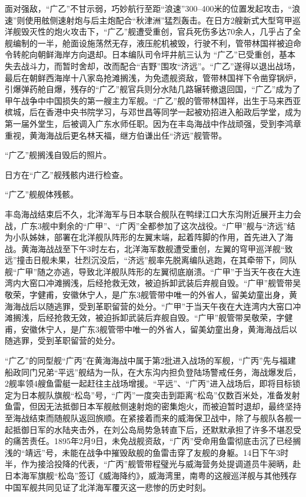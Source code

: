 \documentclass[12pt,UTF8]{ctexbook}
\begin{document}
面对强敌，“广乙”不甘示弱，巧妙航行至距“浪速”300--400米的位置发起攻击，“浪速”则使用舷侧速射炮与后主炮配合“秋津洲”猛烈轰击。在日方2艘新式大型穹甲巡洋舰毁灭性的炮火攻击下，“广乙”舰遭受重创，官兵死伤多达70余人，几乎占了全舰编制的一半，舱面设施荡然无存，液压舵机被毁，行驶不利，管带林国祥被迫命令转舵向朝鲜海岸方向退却。日本编队司令坪井航三认为 “广乙”已受重创，基本失去战斗力，而暂时舍却，改而配合“吉野”围攻“济远”。“广乙”遂得以退出战场，最后在朝鲜西海岸十八家岛抢滩搁浅，为免遗舰资敌，管带林国祥下令凿穿锅炉，引爆弹药舱自爆，残存的“广乙”舰官兵则分水陆几路辗转撤退回国，“广乙”成为了甲午战争中中国损失的第一艘主力军舰。“广乙”舰的管带林国祥，出生于马来西亚槟城，后在香港中央书院学习，与邓世昌等同学一起被劝招进入船政后学堂，成为第一届外堂生，后被调入广东水师任职。因为在丰岛海战中作战顽强，受到李鸿章重视，黄海海战后更名林天福，继方伯谦出任“济远”舰管带。

“广乙”舰搁浅自毁后的照片。

日方在“广乙”舰残骸内进行检查。

“广乙”舰舰体残骸。

丰岛海战结束后不久，北洋海军与日本联合舰队在鸭绿江口大东沟附近展开主力会战，广东3舰中剩余的“广甲”、“广丙”全都参加了这次战役。“广甲”舰与“济远”结为小队姊妹，部署在北洋舰队阵形的左翼末端，起着阵脚的作用，首先进入了海战。黄海海战战至下午3时左右，北洋海军数舰遭受重创，左翼的穹甲巡洋舰“致远”撞击日舰未果，壮烈沉没后，“济远”舰率先脱离编队逃跑，在其牵带下，同队舰“广甲”随之亦逃，导致北洋舰队阵形的左翼彻底崩溃。“广甲”于当天午夜在大连湾内大窑口冲滩搁浅，后经抢救无效，被迫拆卸武装后弃舰自毁。“广甲”舰管带吴敬荣，字健甫，安徽休宁人，是广东3舰管带中唯一的外省人，留美幼童出身，黄海海战后以随逃罪，受到革职留营的处分。“广甲”于当天午夜在大连湾内大窑口冲滩搁浅，后经抢救无效，被迫拆卸武装后弃舰自毁。“广甲”舰管带吴敬荣，字健甫，安徽休宁人，是广东3舰管带中唯一的外省人，留美幼童出身，黄海海战后以随逃罪，受到革职留营的处分。

“广乙”的同型舰“广丙”在黄海海战中属于第2批进入战场的军舰，“广丙”先与福建船政同门兄弟“平远”舰结为一队，在大东沟内担负登陆场警戒任务，海战爆发后，2舰率领4艘鱼雷艇一起赶往主战场增援。“平远”、“广丙”进入战场后，即将目标锁定为日本舰队旗舰“松岛”号，“广丙”一度突击到距离“松岛”仅数百米处，准备发射鱼雷，但因无法抵御日本军舰舷侧速射炮的密集炮火，而被迫暂时退却，最终坚持至海战结束而随舰队返回旅顺。在紧接着而来的威海保卫战中，除了与舰队各舰一起抵御日军的水陆夹击外，在刘公岛局势急转直下后，还默默承担了许多不堪忍受的痛苦责任。1895年2月9日，未免战舰资敌，“广丙”受命用鱼雷彻底击沉了已经搁浅的“靖远”号，未能在战争中摧毁敌舰的鱼雷击穿了友舰的身躯。14日下午3时半，作为接洽投降的代表，“广丙”舰管带程璧光与威海营务处提调道员牛昶昞，赴日本海军旗舰“松岛”签订《威海降约》，威海湾里，南粤的这艘巡洋舰与其他残存中国军舰共同见证了北洋海军覆灭这一悲惨的历史时刻。
\end{document}
